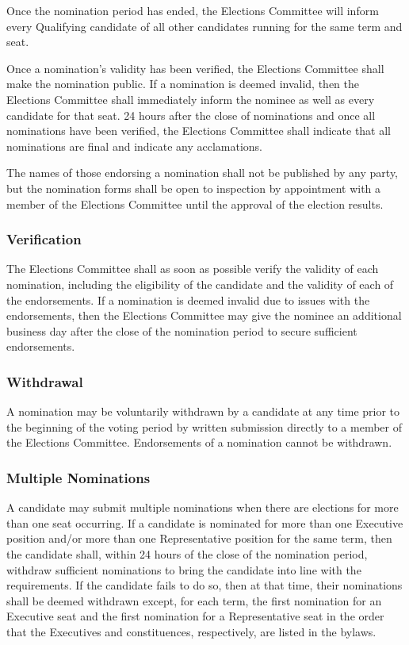 Once the nomination period has ended, the Elections Committee will inform every Qualifying  candidate of all other candidates running for the same term and seat.

Once a nomination's validity has been verified, the Elections Committee shall make the nomination public.
If a nomination is deemed invalid, then the Elections Committee shall immediately inform the nominee as well as every candidate for that seat.
24 hours after the close of nominations and once all nominations have been verified, the Elections Committee shall indicate that all nominations are final and indicate any acclamations.

The names of those endorsing a nomination shall not be published by any party, but the nomination forms shall be open to inspection by appointment with a member of the Elections Committee until the approval of the election results.

\subsubsection{Verification}
The Elections Committee shall as soon as possible verify the validity of each nomination, including the eligibility of the candidate and the validity of each of the endorsements.
If a nomination is deemed invalid due to issues with the endorsements, then the Elections Committee may give the nominee an additional business day after the close of the nomination period to secure sufficient endorsements.

\subsubsection{Withdrawal}
A nomination may be voluntarily withdrawn by a candidate at any time prior to the beginning of the voting period by written submission directly to a member of the Elections Committee.
Endorsements of a nomination cannot be withdrawn.

\subsubsection{Multiple Nominations}
A candidate may submit multiple nominations when there are elections for more than one seat occurring.
If a candidate is nominated for more than one Executive position and/or more than one Representative position for the same term, then the candidate shall, within 24 hours of the close of the nomination period, withdraw sufficient nominations to bring the candidate into line with the requirements.
If the candidate fails to do so, then at that time, their nominations shall be deemed withdrawn except, for each term, the first nomination for an Executive seat and the first nomination for a Representative seat in the order that the Executives and constituences, respectively, are listed in the bylaws.

